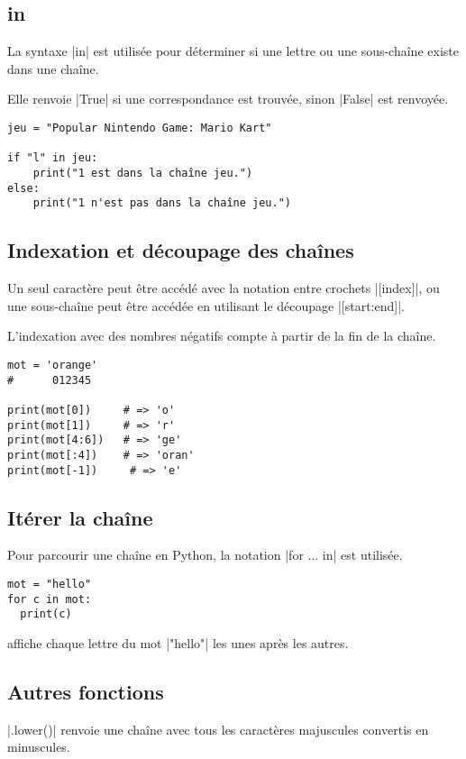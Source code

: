 \documentclass[11pt, a4paper]{book}
\begin{document}
\subsection{in}
La syntaxe |in| est utilisée pour déterminer si une lettre ou une sous-chaîne existe dans une chaîne. 

Elle renvoie |True| si une correspondance est trouvée, sinon |False| est renvoyée.


\begin{lstlisting}
jeu = "Popular Nintendo Game: Mario Kart"

if "l" in jeu:
    print("1 est dans la chaîne jeu.")
else:
    print("1 n'est pas dans la chaîne jeu.")
\end{lstlisting}


\subsection{Indexation et découpage des chaînes}
Un seul caractère peut être accédé avec la notation entre crochets |[index]|, ou une sous-chaîne peut être accédée en utilisant le découpage |[start:end]|.

L'indexation avec des nombres négatifs compte à partir de la fin de la chaîne.



\begin{lstlisting}
mot = 'orange'
#      012345 

print(mot[0])     # => 'o'
print(mot[1])     # => 'r'
print(mot[4:6])   # => 'ge'
print(mot[:4])    # => 'oran'
print(mot[-1])     # => 'e'
\end{lstlisting}


\subsection{Itérer la chaîne}
Pour parcourir une chaîne en Python, la notation |for ... in| est utilisée.



\begin{lstlisting}
mot = "hello"
for c in mot:
  print(c)
\end{lstlisting}
affiche chaque lettre du mot |"hello"| les unes après les autres.

\subsection{Autres fonctions}
|.lower()| renvoie une chaîne avec tous les caractères majuscules convertis en minuscules.
\end{document}
